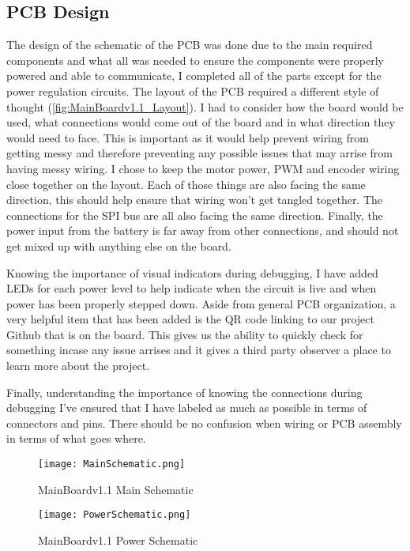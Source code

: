 \documentclass{report}
\begin{document}
    \subsection{PCB Design}
    The design of the schematic of the PCB was done due to the main required components and what all was needed to ensure the components were properly powered and able to communicate, I completed all of the parts except for the power regulation circuits. The layout of the PCB required a different style of thought (\ref{fig:MainBoardv1.1_Layout}). I had to consider how the board would be used, what connections would come out of the board and in what direction they would need to face. This is important as it would help prevent wiring from getting messy and therefore preventing any possible issues that may arrise from having messy wiring. I chose to keep the motor power, PWM and encoder wiring close together on the layout. Each of those things are also facing the same direction, this should help ensure that wiring won't get tangled together. The connections for the SPI bus are all also facing the same direction. Finally, the power input from the battery is far away from other connections, and should not get mixed up with anything else on the board.

    Knowing the importance of visual indicators during debugging, I have added LEDs for each power level to help indicate when the circuit is live and when power has been properly stepped down. Aside from general PCB organization, a very helpful item that has been added is the QR code linking to our project Github that is on the board. This gives us the ability to quickly check for something incase any issue arrises and it gives a third party observer a place to learn more about the project.

    Finally, understanding the importance of knowing the connections during debugging I've ensured that I have labeled as much as possible in terms of connectors and pins. There should be no confusion when wiring or PCB assembly in terms of what goes where.

    \begin{figure}[ht!]
        \centering
        \texttt{[image: MainSchematic.png]}
        \caption{MainBoardv1.1 Main Schematic}
        \label{fig:MainSchematic}
    \end{figure}

    \begin{figure}[ht!]
        \centering
        \texttt{[image: PowerSchematic.png]}
        \caption{MainBoardv1.1 Power Schematic}
        \label{fig:PowerSchematic}
    \end{figure}
\end{document}
